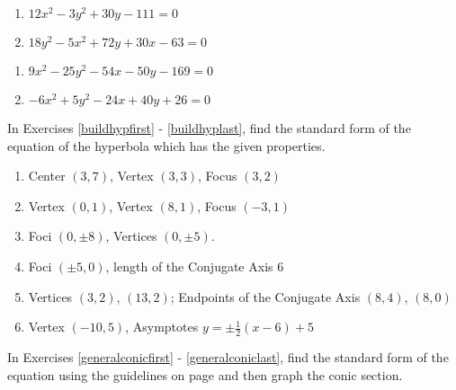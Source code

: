 \begin{multicols}{2}
\begin{enumerate}
\setcounter{enumi}{\value{HW}}

\item $12x^{2} - 3y^{2} + 30y - 111 = 0$  \label{stdfrmhypfirst}
\item $18y^{2} - 5x^{2} +  72y + 30x - 63= 0$

\setcounter{HW}{\value{enumi}}
\end{enumerate}
\end{multicols}

\begin{multicols}{2}
\begin{enumerate}
\setcounter{enumi}{\value{HW}}

\item $9x^2-25y^2-54x-50y-169 = 0$
\item $-6x^2+5y^2-24x+40y+26=0$  \label{stdfrmhyplast}

\setcounter{HW}{\value{enumi}}
\end{enumerate}
\end{multicols}


In Exercises \ref{buildhypfirst} - \ref{buildhyplast},  find the standard form of the equation of the hyperbola which has the given properties.

\begin{enumerate}

\setcounter{enumi}{\value{HW}}

\item Center $(3, 7)$, Vertex $(3, 3)$, Focus $(3, 2)$  \label{buildhypfirst}
\item Vertex $(0, 1)$, Vertex $(8, 1)$, Focus $(-3, 1)$

\item Foci $(0, \pm 8)$, Vertices $(0, \pm 5)$.
\item Foci $(\pm 5, 0)$, length of the Conjugate Axis $6$


\item Vertices $(3,2)$, $(13,2)$; Endpoints of the Conjugate Axis $(8,4)$, $(8,0)$
\item Vertex $(-10, 5)$, Asymptotes $y = \pm \frac{1}{2}(x - 6) + 5$ \label{buildhyplast}

\setcounter{HW}{\value{enumi}}
\end{enumerate}


In Exercises \ref{generalconicfirst} - \ref{generalconiclast}, find the standard form of the equation using the guidelines on page \pageref{idconocsrulesofthumb} and then graph the conic section.

